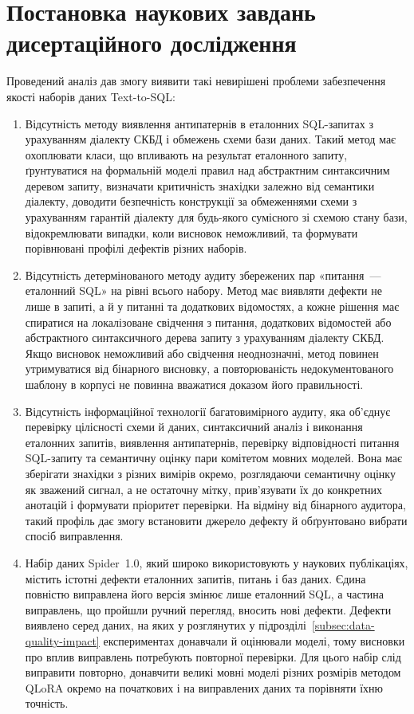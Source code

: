\documentclass[a4paper,14pt,oneside]{extreport}
\begin{document}
\section{Постановка наукових завдань дисертаційного дослідження}
\label{sec:problem-statement}

Проведений аналіз дав змогу виявити такі невирішені проблеми забезпечення якості наборів даних Text-to-SQL:

\begin{enumerate}
\item Відсутність методу виявлення антипатернів в еталонних SQL-запитах з урахуванням діалекту СКБД і обмежень схеми бази даних. Такий метод має охоплювати класи, що впливають на результат еталонного запиту, ґрунтуватися на формальній моделі правил над абстрактним синтаксичним деревом запиту, визначати критичність знахідки залежно від семантики діалекту, доводити безпечність конструкції за обмеженнями схеми з урахуванням гарантій діалекту для будь-якого сумісного зі схемою стану бази, відокремлювати випадки, коли висновок неможливий, та формувати порівнювані профілі дефектів різних наборів.

\item Відсутність детермінованого методу аудиту збережених пар «питання~--- еталонний SQL» на рівні всього набору. Метод має виявляти дефекти не лише в запиті, а й у питанні та додаткових відомостях, а кожне рішення має спиратися на локалізоване свідчення з питання, додаткових відомостей або абстрактного синтаксичного дерева запиту з урахуванням діалекту СКБД. Якщо висновок неможливий або свідчення неоднозначні, метод повинен утримуватися від бінарного висновку, а повторюваність недокументованого шаблону в корпусі не повинна вважатися доказом його правильності.

\item Відсутність інформаційної технології багатовимірного аудиту, яка об'єднує перевірку цілісності схеми й даних, синтаксичний аналіз і виконання еталонних запитів, виявлення антипатернів, перевірку відповідності питання SQL-запиту та семантичну оцінку пари комітетом мовних моделей. Вона має зберігати знахідки з різних вимірів окремо, розглядаючи семантичну оцінку як зважений сигнал, а не остаточну мітку, прив'язувати їх до конкретних анотацій і формувати пріоритет перевірки. На відміну від бінарного аудитора, такий профіль дає змогу встановити джерело дефекту й обґрунтовано вибрати спосіб виправлення.

\item Набір даних Spider~1.0, який широко використовують у наукових публікаціях, містить істотні дефекти еталонних запитів, питань і баз даних. Єдина повністю виправлена його версія змінює лише еталонний SQL, а частина виправлень, що пройшли ручний перегляд, вносить нові дефекти. Дефекти виявлено серед даних, на яких у розглянутих у підрозділі~\ref{subsec:data-quality-impact} експериментах донавчали й оцінювали моделі, тому висновки про вплив виправлень потребують повторної перевірки. Для цього набір слід виправити повторно, донавчити великі мовні моделі різних розмірів методом QLoRA окремо на початкових і на виправлених даних та порівняти їхню точність.
\end{enumerate}
\end{document}
